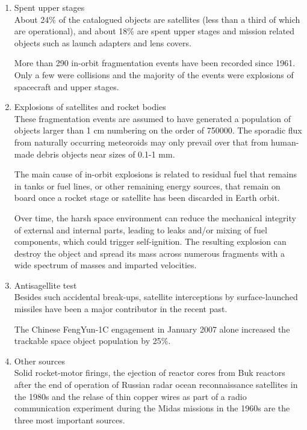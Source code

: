 \begin{enumerate}
\item{Spent upper stages}\\
About 24\% of the catalogued objects are satellites (less than a third of which are operational), and about 18\% are spent upper stages and mission related objects such as launch adapters and lens covers.

More than 290 in-orbit fragmentation events have been recorded since 1961. Only a few were collisions and the majority of the events were explosions of spacecraft and upper stages.

\item{Explosions of satellites and rocket bodies}\\
These fragmentation events are assumed to have generated a population of objects larger than 1 cm numbering on the order of 750000. The sporadic flux from naturally occurring meteoroids may only prevail over that from human-made debris objects near sizes of 0.1-1 mm.

The main cause of in-orbit explosions is related to residual fuel that remains in tanks or fuel lines, or other remaining energy sources, that remain on board once a rocket stage or satellite has been discarded in Earth orbit.

Over time, the harsh space environment can reduce the mechanical integrity of external and internal parts, leading to leaks and/or mixing of fuel components, which could trigger self-ignition. The resulting explosion can destroy the object and spread its mass across numerous fragments with a wide spectrum of masses and imparted velocities.

\item{Antisagellite test}\\
Besides such accidental break-ups, satellite interceptions by surface-launched missiles have been a major contributor in the recent past.

The Chinese FengYun-1C engagement in January 2007 alone increased the trackable space object population by 25\%.
\item{Other sources}\\
Solid rocket-motor firings, the ejection of reactor cores from Buk reactors after the end of operation of Russian radar ocean reconnaissance satellites in the 1980s and the relase of thin copper wires as part of a radio communication experiment during the Midas missions in the 1960s are the three most important sources.
\end{enumerate}

